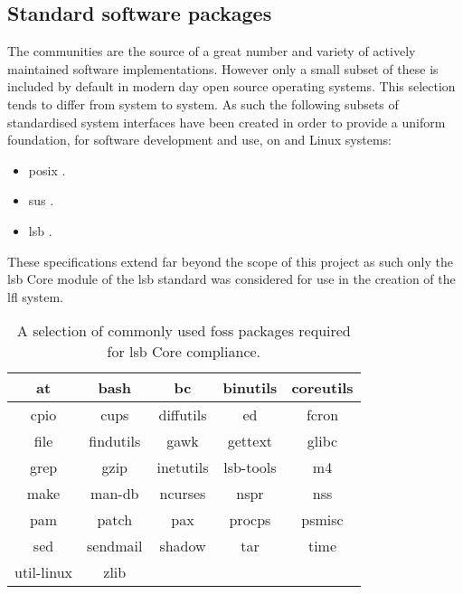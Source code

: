 \subsection{Standard software packages}

The  communities are the source of a great number and variety of actively maintained software implementations. However only a small subset of these is included by default in modern day open source operating systems. This selection tends to differ from system to system. As such the following subsets of standardised system interfaces have been created in order to provide a uniform foundation, for software development and use, on  and Linux systems:

\begin{itemize}
    \item \gls{posix} \cite{posix}.
    \item \gls{sus} \cite{susv4}.
    \item \gls{lsb} \cite{lsb}.
\end{itemize}

These specifications extend far beyond the scope of this project as such only the \gls{lsb} Core module of the \gls{lsb} standard was considered for use in the creation of the \gls{lfl} system.

\begin{table}[H]
    \centering
    \begin{tabular}{|c|c|c|c|c|}
        \hline
        at & bash & bc & binutils & coreutils \\
        \hline
        cpio & cups & diffutils & ed & fcron \\
        \hline
        file & findutils & gawk & gettext & glibc \\
        \hline
        grep & gzip & inetutils & lsb-tools & m4 \\
        \hline
        make & man-db & ncurses & nspr & nss \\
        \hline
        pam & patch & pax & procps & psmisc \\
        \hline
        sed & sendmail & shadow & tar & time \\
        \hline
        util-linux & zlib \\
        \cline{1-2}
    \end{tabular}
    \caption{A selection of commonly used \gls{foss} packages required for \gls{lsb} Core compliance.}
    \label{table:LSB Core}
\end{table}

